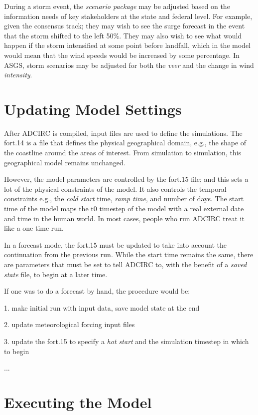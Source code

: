 \documentclass{article}
\begin{document}
During a storm event, the \textit{scenario package} may be adjusted based on the
information needs of key stakeholders at the state and federal level. For example,
given the consensus track; they may wish to see the surge forecast in the event that
the storm shifted to the left 50\%. They may also wish to see what would happen if the
storm intensified at some point before landfall, which in the model would mean that
the wind speeds would be increased by some percentage. In ASGS, storm scenarios may
be adjusted for both the \textit{veer} and the change in wind \textit{intensity}.

\section{Updating Model Settings}

After ADCIRC is compiled, input files are used to define the simulations. The fort.14
is a file that defines the physical geographical domain, e.g., the shape of the coastline
around the areas of interest. From simulation to simulation, this geographical model
remains unchanged.

However, the model parameters are controlled by the fort.15 file; and this sets a lot
of the physical constraints of the model. It also controls the temporal constraints
e.g., the \textit{cold start} time, \textit{ramp time}, and number of days. The start
time of the model maps the t0 timestep of the model with a real external date and time
in the human world. In most cases, people who run ADCIRC treat it like a one time run.

In a forecast mode, the fort.15 must be updated to take into account the continuation
from the previous run. While the start time remains the same, there are parameters that
must be set to tell ADCIRC to, with the benefit of a \textit{saved state} file, to begin
at a later time.

If one was to do a forecast by hand, the procedure would be:

1. make initial run with input data, save model state at the end

2. update meteorological forcing input files

3. update the fort.15 to specify a \textit{hot start} and the simulation timestep in
which to begin

...


\section{Executing the Model}
\end{document}
